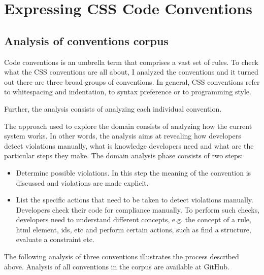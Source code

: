\documentclass[parskip=full]{uvamscse}
\begin{document}

\chapter{Expressing CSS Code Conventions}

\section{Analysis of conventions corpus}

Code conventions is an umbrella term that comprises a vast set of rules. To check what the CSS
conventions are all about, I analyzed the conventions and it turned out there are three broad groups
of conventions. In general, CSS conventions refer to whitespacing and indentation, to syntax
preference or to programming style.

Further, the analysis consists of analyzing each individual convention.

The approach used to explore the domain consists of analyzing how the current system works. In other
words, the analysis aims at revealing how developers detect violations manually, what is knowledge
developers need and what are the particular steps they make. The domain analysis phase consists of
two steps:

  \begin{itemize}
    \item Determine possible violations. In this step the meaning of the convention is discussed and violations are made explicit.
    \item List the specific actions that need to be taken to detect violations manually. Developers check their code for compliance manually. To perform such checks, developers need to understand different concepts, e.g. the concept of a rule, html element, ids, etc and perform certain actions, such as find a structure, evaluate a constraint etc.
  \end{itemize}

The following analysis of three conventions illustrates the process described above. Analysis of all
conventions in the corpus are available at GitHub.
\end{document}
